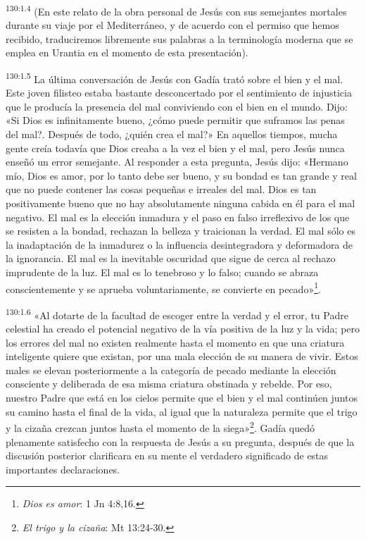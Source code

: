 \par
\textsuperscript{130:1.4} (En este relato de la obra personal de Jesús con sus semejantes mortales durante su viaje por el Mediterráneo, y de acuerdo con el permiso que hemos recibido, traduciremos libremente sus palabras a la terminología moderna que se emplea en Urantia en el momento de esta presentación).

\par
\textsuperscript{130:1.5} La última conversación de Jesús con Gadía trató sobre el bien y el mal. Este joven filisteo estaba bastante desconcertado por el sentimiento de injusticia que le producía la presencia del mal conviviendo con el bien en el mundo. Dijo: «Si Dios es infinitamente bueno, ¿cómo puede permitir que suframos las penas del mal?. Después de todo, ¿quién crea el mal?» En aquellos tiempos, mucha gente creía todavía que Dios creaba a la vez el bien y el mal, pero Jesús nunca enseñó un error semejante. Al responder a esta pregunta, Jesús dijo: «Hermano mío, Dios es amor, por lo tanto debe ser bueno, y su bondad es tan grande y real que no puede contener las cosas pequeñas e irreales del mal. Dios es tan positivamente bueno que no hay absolutamente ninguna cabida en él para el mal negativo. El mal es la elección inmadura y el paso en falso irreflexivo de los que se resisten a la bondad, rechazan la belleza y traicionan la verdad. El mal sólo es la inadaptación de la inmadurez o la influencia desintegradora y deformadora de la ignorancia. El mal es la inevitable oscuridad que sigue de cerca al rechazo imprudente de la luz. El mal es lo tenebroso y lo falso; cuando se abraza conscientemente y se aprueba voluntariamente, se convierte en pecado»\footnote{\textit{Dios es amor}: 1 Jn 4:8,16.}.

\par
\textsuperscript{130:1.6} «Al dotarte de la facultad de escoger entre la verdad y el error, tu Padre celestial ha creado el potencial negativo de la vía positiva de la luz y la vida; pero los errores del mal no existen realmente hasta el momento en que una criatura inteligente quiere que existan, por una mala elección de su manera de vivir. Estos males se elevan posteriormente a la categoría de pecado mediante la elección consciente y deliberada de esa misma criatura obstinada y rebelde. Por eso, nuestro Padre que está en los cielos permite que el bien y el mal continúen juntos su camino hasta el final de la vida, al igual que la naturaleza permite que el trigo y la cizaña crezcan juntos hasta el momento de la siega»\footnote{\textit{El trigo y la cizaña}: Mt 13:24-30.}. Gadía quedó plenamente satisfecho con la respuesta de Jesús a su pregunta, después de que la discusión posterior clarificara en su mente el verdadero significado de estas importantes declaraciones.

